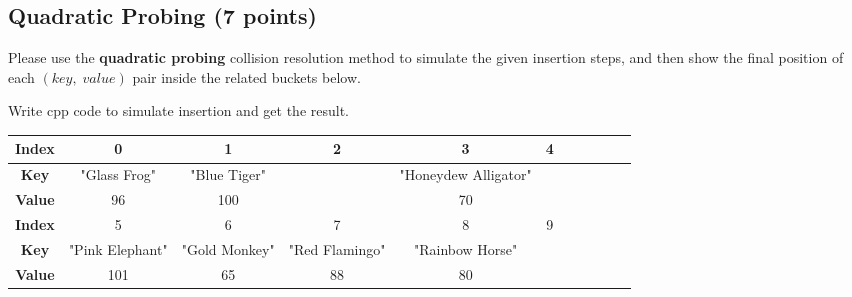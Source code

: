 \documentclass[11pt]{exam}
\begin{document}
\subsection{Quadratic Probing (7 points)}
Please use the \textbf{quadratic probing} collision resolution method to simulate the given insertion steps, and then show the final position of each $(key,\;value)$ pair inside the related buckets below.
\begin{solution}
    Write cpp code to simulate insertion and get the result.
    \begin{table}[H]
        \centering
        \footnotesize
        \renewcommand{\arraystretch}{2}
        \begin{tabular}{|c|c|c|c|c|c|c|c|c|c|c|}
            \hline
            \textbf{Index} & 0               & 1             & 2              & 3                    & 4 \\
            \hline
            \textbf{Key}   & "Glass Frog"    & "Blue Tiger"  &                & "Honeydew Alligator" &   \\
            \hline
            \textbf{Value} & 96              & 100           &                & 70                   &   \\
            \hline
            \textbf{Index} & 5               & 6             & 7              & 8                    & 9 \\
            \hline
            \textbf{Key}   & "Pink Elephant" & "Gold Monkey" & "Red Flamingo" & "Rainbow Horse"      &   \\
            \hline
            \textbf{Value} & 101             & 65            & 88             & 80                   &   \\
            \hline
        \end{tabular}
    \end{table}
\end{solution}
\end{document}
